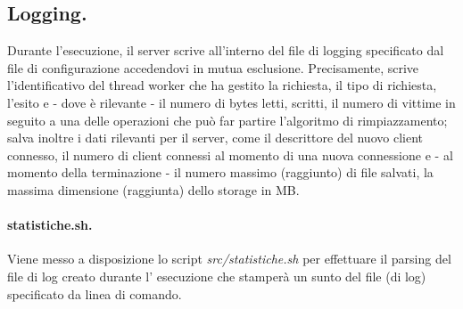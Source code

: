 \documentclass[11pt, italian, openany]{book}
\begin{document}
\begin{sloppypar}
\subsection{Logging.}
Durante l'esecuzione, il server scrive all'interno del file di logging specificato dal file di configurazione accedendovi in mutua
esclusione. Precisamente, scrive l'identificativo del thread worker che ha gestito la richiesta, il tipo di richiesta, l'esito e -
dove \`e rilevante - il numero di bytes letti, scritti, il numero di vittime in seguito a una delle operazioni che pu\`o far
partire l'algoritmo di rimpiazzamento; salva inoltre i dati rilevanti per il server, come il descrittore del nuovo client
connesso, il numero di client connessi al momento di una nuova connessione e - al momento della terminazione - il numero
massimo (raggiunto) di file salvati, la massima dimensione (raggiunta) dello storage in MB.

\paragraph*{statistiche.sh.}
Viene messo a disposizione lo script \textit{src/statistiche.sh} per effettuare il parsing del file di log creato durante l'
esecuzione che stamper\`a un sunto del file (di log) specificato da linea di comando.

\pagebreak
\end{sloppypar}
\end{document}
